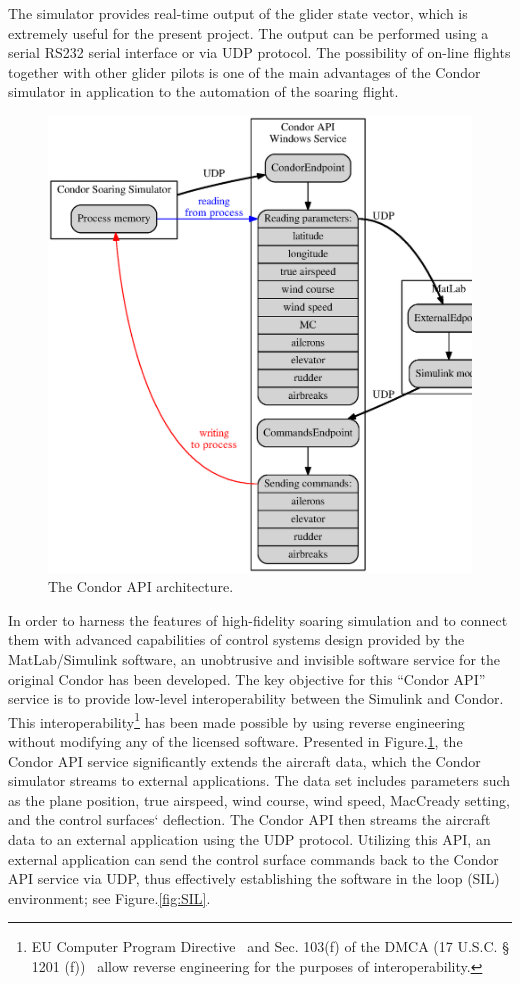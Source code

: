 \documentclass[letterpaper, 10 pt, conference]{ieeeconf}  %
\begin{document}
The simulator provides real-time output of the glider state vector, which is extremely useful for the present project. The output can be performed using a serial RS232 serial interface or via UDP protocol. The possibility of on-line flights together with other glider pilots is one of the main advantages of the Condor simulator in application to the automation of the soaring flight.
\begin{figure}[thpb]
  \centering
  \includegraphics[scale=0.3]{Figures/api_arch.eps}
  \caption{The Condor API architecture.}
  \label{fig:api_arch}
\end{figure}
In order to harness the features of high-fidelity soaring simulation and to connect them with advanced capabilities of control systems design provided by the MatLab/Simulink software, an unobtrusive and invisible software service for the original Condor has been developed. The key objective for this ``Condor API'' service is to provide low-level interoperability between the Simulink and Condor. This interoperability\footnote{EU Computer Program Directive~\cite{EU_CPD:2009:Online} and Sec. 103(f) of the DMCA (17 U.S.C. § 1201 (f))~\cite{DMCA:2013:Online} allow reverse engineering for the purposes of interoperability.} has been made possible by using reverse engineering without modifying any of the licensed software. Presented in Figure.\ref{fig:api_arch}, the Condor API service significantly extends the aircraft data, which the Condor simulator streams to external applications. The data set includes parameters such as the plane position, true airspeed, wind course, wind speed, MacCready setting, and the control surfaces` deflection. The Condor API then streams the aircraft data to an external application using the UDP protocol. Utilizing this API, an external application can send the control surface commands back to the Condor API service via UDP, thus effectively establishing the software in the loop (SIL) environment; see Figure.\ref{fig:SIL}.
\end{document}
